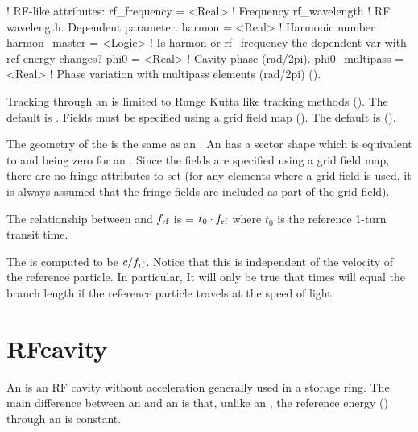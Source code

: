 {\begin{example}
  ! RF-like attributes:
  rf_frequency    = <Real>    ! Frequency
  rf_wavelength               ! RF wavelength. Dependent parameter.
  harmon          = <Real>    ! Harmonic number
  harmon_master   = <Logic>   ! Is harmon or rf_frequency the dependent var with ref energy changes?
  phi0            = <Real>    ! Cavity phase (rad/2pi).
  phi0_multipass  = <Real>    ! Phase variation with multipass elements (rad/2pi) ().
\end{example}

Tracking through an  is limited to Runge Kutta like tracking methods (). The
default  is . Fields must be specified using a grid field map
(). The default  is  ().

The geometry of the  is the same as an . An  has a sector shape
which is equivalent to  and  being zero for an . Since the fields are specified
using a grid field map, there are no fringe attributes to set (for any elements where a grid field is
used, it is always assumed that the fringe fields are included as part of the grid field).

The relationship between  and $f_{\text{rf}}$ is 
 = $t_0 \cdot f_{\text{rf}}$ where $t_0$ is the reference 1-turn transit time.

The  is computed to be $c / f_{\text{rf}}$. Notice that this is independent of the
velocity of the reference particle. In particular, It will only be true that  times
 will equal the branch length if the reference particle travels at the speed of light.

\newpage

\section{RFcavity}
\label{s:rfcav}

An  is an RF cavity without acceleration generally used in a storage ring. The main
difference between an  and an  is that, unlike an , the
reference energy () through an  is constant.

}
